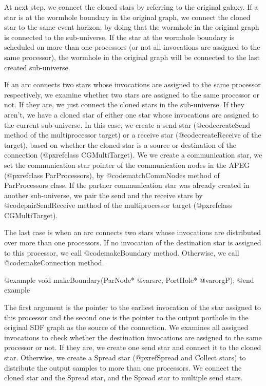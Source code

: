 At next step, we connect the cloned stars by referring to the original
galaxy. If a star is at the wormhole boundary in the original graph,
we connect the cloned star to the same event horizon; by doing that
the wormhole in the original graph is connected to the sub-universe.
If the star at the wormhole boundary is scheduled on more than one
processors (or not all invocations are assigned to the same processor),
the wormhole in the original graph will be connected to the last
created sub-universe. 

If an arc connects two stars whose invocations are assigned to the same
processor respectively, we examine whether two stars are assigned to
the same processor or not. If they are, we just connect the cloned
stars in the sub-universe. If they aren't, we have a cloned star of
either one star whose invocations are assigned to the current sub-universe.
In this case, we create a send star (@code{createSend} method of
the multiprocessor target) or a receive star (@code{createReceive} of the
target), based on whether the cloned star is a source or destination of
the connection (@pxref{class CGMultiTarget}). We we create a
communication star, we set the communication star pointer of
the communication nodes in the APEG (@pxref{class ParProcessors}), 
by @code{matchCommNodes} method of ParProcessors class.
If the partner communication star was already created in another
sub-universe, we pair the send and the receive stars by
@code{pairSendReceive} method of the multiprocessor target
(@pxref{class CGMultiTarget}).

The last case is when an arc connects two stars whose invocations are
distributed over more than one processors. If no invocation of
the destination star is assigned to this processor, we call
@code{makeBoundary} method. Otherwise, we call @code{makeConnection} method.

@example
void makeBoundary(ParNode* @var{src}, PortHole* @var{orgP});
@end example

The first argument is the pointer to the earliest invocation of 
the star assigned to this processor and the second one is the pointer to
the output porthole in the original SDF graph as the source of the
connection. We examines all assigned invocations to check whether
the destination invocations are assigned to the same processor or not.
If they are, we create one send star and connect it to the cloned star.
Otherwise, we create a Spread star (@pxref{Spread and Collect stars})
to distribute the output samples
to more than one processors. We connect the cloned star and the Spread star, 
and the Spread star to multiple send stars.

